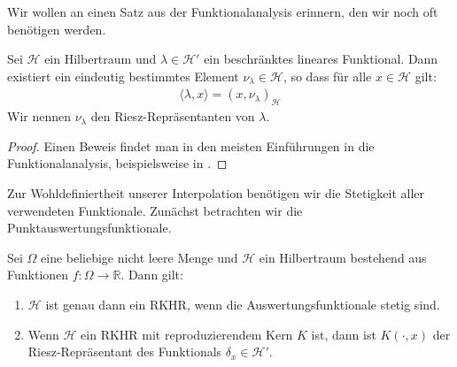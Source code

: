 Wir wollen an einen Satz aus der Funktionalanalysis erinnern, den wir noch oft benötigen werden.

\begin{theorem}
Sei $\mathcal{H}$ ein Hilbertraum und $\lambda \in \mathcal{H}'$ ein beschränktes lineares Funktional. Dann existiert ein eindeutig bestimmtes Element $\nu_\lambda \in \mathcal{H}$, so dass für alle $x \in \mathcal{H}$ gilt:
\begin{align*}
\langle \lambda, x \rangle = \left( x, \nu_\lambda \right)_\mathcal{H}
\end{align*}
Wir nennen $\nu_\lambda$ den Riesz-Repräsentanten von $\lambda$.

\end{theorem}
\begin{proof}
	Einen Beweis findet man in den meisten Einführungen in die Funktionalanalysis, beispielsweise in \textcite[Satz 7.3]{Kaballo.2018}.
\end{proof}

Zur Wohldefiniertheit unserer Interpolation benötigen wir die Stetigkeit aller verwendeten Funktionale. Zunächst betrachten wir die Punktauswertungsfunktionale.

\begin{theorem}
\label{stetig}
Sei $\Omega$ eine beliebige nicht leere Menge und $\mathcal{H}$ ein Hilbertraum bestehend aus Funktionen $f: \Omega \rightarrow \mathbb{R}$. Dann gilt:
\begin{enumerate}
\item \label{stetig1} $\mathcal{H}$ ist genau dann ein \ac{RKHR}, wenn die Auswertungsfunktionale stetig sind.
\item \label{stetig2} Wenn $\mathcal{H}$ ein \ac{RKHR} mit reproduzierendem Kern $K$ ist, dann ist $K(\cdot,x)$ der Riesz-Repräsentant des Funktionals $\delta_x \in \mathcal{H}'$.
\end{enumerate}
\end{theorem}

